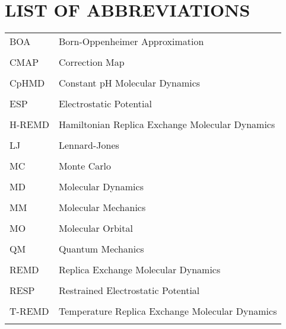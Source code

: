 
\chapter*{LIST OF ABBREVIATIONS}

\singlespacing

\begin{tabular}{lp{5in}}

BOA & Born-Oppenheimer Approximation \\ \\

CMAP & Correction Map \\ \\ 

CpHMD & Constant pH Molecular Dynamics \\ \\

ESP & Electrostatic Potential \\ \\

H-REMD & Hamiltonian Replica Exchange Molecular Dynamics \\ \\

LJ & Lennard-Jones \\ \\

MC & Monte Carlo \\ \\

MD & Molecular Dynamics \\ \\

MM & Molecular Mechanics \\ \\

MO & Molecular Orbital \\ \\

QM & Quantum Mechanics \\ \\

REMD & Replica Exchange Molecular Dynamics \\ \\

RESP & Restrained Electrostatic Potential \\ \\

T-REMD & Temperature Replica Exchange Molecular Dynamics \\ \\

\end{tabular}

